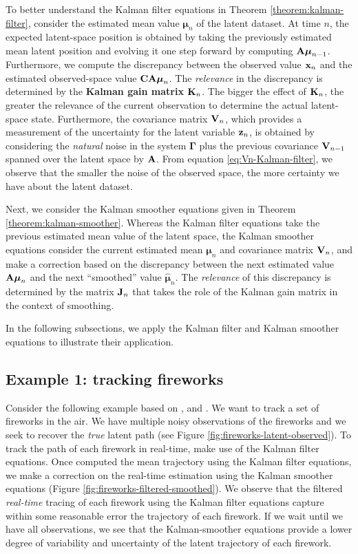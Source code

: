 \documentclass[11pt]{article}
\numberwithin{equation}{section}
\newcommand{\x}{{\bf x}}
\newcommand{\z}{{\bf z}}
\begin{document}
To better understand the Kalman filter equations in Theorem \ref{theorem:kalman-filter}, consider the estimated mean value $\boldsymbol{\mu}_n$ of the latent dataset. At time $n$, the expected latent-space position is obtained by taking the previously estimated mean latent position and evolving it one step forward by computing ${\bf A}\boldsymbol{\mu}_{n-1}$. Furthermore, we compute the discrepancy between the observed value $\x_n$ and the estimated observed-space value ${\bf CA}\boldsymbol{\mu}_n$. The \textit{relevance} in the discrepancy is determined by the \textbf{Kalman gain matrix} ${\bf K}_n$. The bigger the effect of ${\bf K}_n$, the greater the relevance of the current observation to determine the actual latent-space state. Furthermore, the covariance matrix ${\bf V}_n$, which provides a measurement of the uncertainty for the latent variable $\z_n$, is obtained by considering the \textit{natural} noise in the system $\boldsymbol{\Gamma}$ plus the previous covariance ${\bf V}_{n-1}$ spanned over the latent space by $\bf A$. From equation \eqref{eq:Vn-Kalman-filter}, we observe that the smaller the noise of the observed space, the more certainty we have about the latent dataset.

Next, we consider the Kalman smoother equations given in Theorem \ref{theorem:kalman-smoother}. Whereas the Kalman filter equations take the previous estimated mean value of the latent space, the Kalman smoother equations consider the current estimated mean $\boldsymbol{\mu}_n$ and covariance matrix ${\bf V}_n$, and make a correction based on the discrepancy between the next estimated value ${\bf A} \boldsymbol{\mu}_n$ and the next ``smoothed'' value $\hat{\boldsymbol{\mu}}_n$. The \textit{relevance} of this discrepancy is determined by the matrix ${\bf J}_n$ that takes the role of the Kalman gain matrix in the context of smoothing.

In the following subsections, we apply the Kalman filter and Kalman smoother equations to illustrate their application.

\subsection{Example 1: tracking fireworks}
Consider the following example based on \cite{pml2Book}, and \cite{koller2009}. We want to track a set of fireworks in the air. We have multiple noisy observations of the fireworks and we seek to recover the \textit{true} latent path (see Figure \ref{fig:fireworks-latent-observed}). To track the path of each firework in real-time, make use of the Kalman filter equations. Once computed the mean trajectory using the Kalman filter equations, we make a correction on the real-time estimation using the Kalman smoother equations (Figure \ref{fig:fireworks-filtered-smoothed}). We observe that the filtered \textit{real-time} tracing of each firework using the Kalman filter equations capture within some reasonable error the trajectory of each firework. If we wait until we have all observations, we see that the Kalman-smoother equations provide a lower degree of variability and uncertainty of the latent trajectory of each firework.
\end{document}
